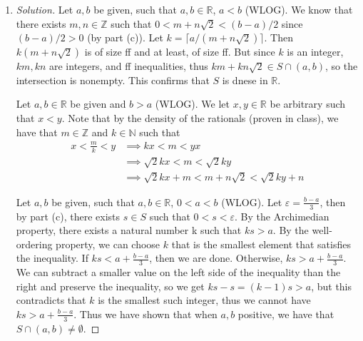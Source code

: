 \documentclass{article}
\newcommand{\N}{{\mathbb N}}
\newcommand{\Z}{{\mathbb Z}}
\newcommand{\R}{{\mathbb R}}
\newcommand{\ep}{{\varepsilon}}
\begin{document}
\begin{enumerate}
\begin{proof}[Solution]
		Now, see that $0 < \sqrt{2} - 1 < 2^{-1}$, since $1.5^2 > 2$.
		Furthermore, since these are both positive values,
		exponentiating them to some natural number will preserve the inequality.
		Thus if we exponentiate them by $j$,
		we see $0 < (\sqrt{2} - 1)^j < 2^{-j} < \ep$.
		By binomial theorem, we have
		\[
			0 < \sum_{k=0}^{j}\binom{j}{k}(\sqrt{2})^{k}(-1)^{j-k} < \ep
		\]
		Note that if $k$ is even, $(\sqrt{2})^k = 2^{k/2}$ which is an integer,
		and if $j$ is odd, $(\sqrt{2})^k = 2^{(k-1)/2}\sqrt{2}$ which is a multiple of $\sqrt{2}$.
		Regardless then,
		since $\binom{j}{k}$ is always an integer,
		we have that our summation is just the sum of an integer and a multiple of $\sqrt{2}$.
		Specifically, if
		\[
			m = \sum_{\substack{k=0 \\ k\text{ even}}}^j\binom{j}{k}2^{k/2}(-1)^{j-k}, \quad
			n = \sum_{\substack{k=0 \\ k\text{ odd}}}^j\binom{j}{k}2^{(k-1)/2}(-1)^{j-k}
		\]
	\end{proof} 
	Then $m,n\in\Z$,
	and $0 < m + n\sqrt{2} < \ep$.
	Thus $m + n\sqrt{2} \in S \cap (0,\ep)$
	and so the set is not empty.
	\item \begin{proof}[Solution]\let\qed\relax
		Let $a,b$ be given, such that $a,b \in \R$, $a < b$ (WLOG).
		We know that there exists $m,n \in \Z$
		such that $0 < m + n\sqrt{2} < (b-a)/2$ since $(b-a)/2 > 0$
		(by part (c)).
		Let $k = \lceil a/(m + n\sqrt{2}) \rceil$.
		Then $k(m + n\sqrt{2})$ is of size ff and at least,
		of size ff.
		But since $k$ is an integer, $km,kn$ are integers,
		and ff inequalities,
		thus $km + kn\sqrt{2} \in S \cap (a,b)$,
		so the intersection is nonempty.
		This confirms that $S$ is dnese in $\R$.


		Let $a,b \in \R$ be given and $b>a$ (WLOG).
		We let $x,y \in \R$ be arbitrary such that $x<y$.
		Note that by the density of the rationals (proven in class),
		we have that $m\in\Z$ and $k \in \N$ such that
		\begin{align*}
			x < \frac{m}{k} < y
			&\implies kx < m < yx\\
			&\implies \sqrt{2}kx < m < \sqrt{2}ky\\
			&\implies \sqrt{2}kx + m < m + n\sqrt{2} < \sqrt{2}ky + n
		\end{align*}

		Let $a,b$ be given, such that $a,b \in \R$, $0 < a < b$ (WLOG).
		Let $\ep = \frac{b-a}{3}$,
		then by part (c), there exists $s \in S$ such that $0 < s < \ep$.
		By the Archimedian property, there exists a natural number k
		such that $ks > a$.
		By the well-ordering property, we can choose $k$ that is the smallest element
		that satisfies the inequality.
		If $ks < a + \frac{b-a}{3}$, then we are done.
		Otherwise, $ks > a + \frac{b-a}{3}$.
		We can subtract a smaller value on the left side of the inequality
		than the right and preserve the inequality,
		so we get $ks - s = (k-1)s > a$,
		but this contradicts that $k$ is the smallest such integer,
		thus we cannot have $ks > a + \frac{b-a}{3}$.
		Thus we have shown that when $a,b$ positive,
		we have that $S \cap (a,b) \neq \emptyset$.


\end{proof}
\end{enumerate}
\end{document}
